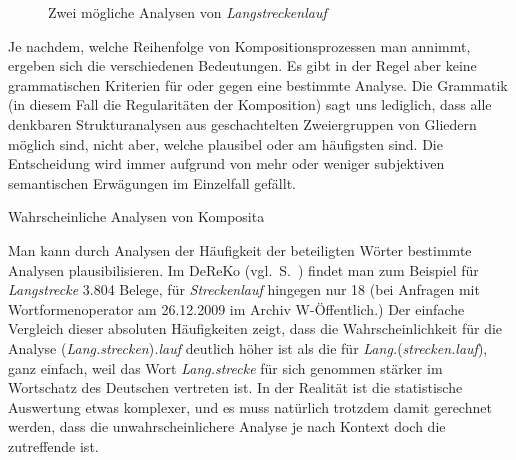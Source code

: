 \begin{exe}
  \ex\label{ex:kompbrack}\begin{xlist}
  \end{xlist}
\end{exe}

\begin{figure}[!htbp]
  \centering
  \hspace{0.09\textwidth}
  \caption{Zwei mögliche Analysen von \textit{Langstreckenlauf}}
  \label{fig:langstreckenlauf}
\end{figure}

Je nachdem, welche Reihenfolge von Kompositionsprozessen man annimmt, ergeben sich die verschiedenen Bedeutungen.
Es gibt in der Regel aber keine grammatischen Kriterien für oder gegen eine bestimmte Analyse.
Die Grammatik (in diesem Fall die Regularitäten der Komposition) sagt uns lediglich, dass alle denkbaren Strukturanalysen aus geschachtelten Zweiergruppen von Gliedern möglich sind, nicht aber, welche plausibel oder am häufigsten sind.
Die Entscheidung wird immer aufgrund von mehr oder weniger subjektiven semantischen Erwägungen im Einzelfall gefällt.


\begin{Vertiefung}{Wahrscheinliche Analysen von Komposita}

\noindent Man kann durch Analysen der Häufigkeit der beteiligten Wörter bestimmte Analysen plausibilisieren.
Im DeReKo (vgl.\ S.~\pageref{abs:dereko}) findet man zum Beispiel für \textit{Langstrecke} 3.804 Belege, für \textit{Streckenlauf} hingegen nur 18 (bei Anfragen mit Wortformenoperator am 26.12.2009 im Archiv W-Öffentlich.)
Der einfache Vergleich dieser absoluten Häufigkeiten zeigt, dass die Wahrscheinlichkeit für die Analyse (\textit{Lang.strecken})\textit{.lauf} deutlich höher ist als die für \textit{Lang.}(\textit{strecken.lauf}), ganz einfach, weil das Wort \textit{Lang.strecke} für sich genommen stärker im Wortschatz des Deutschen vertreten ist.
In der Realität ist die statistische Auswertung etwas komplexer, und es muss natürlich trotzdem damit gerechnet werden, dass die unwahrscheinlichere Analyse je nach Kontext doch die zutreffende ist.

\end{Vertiefung}

